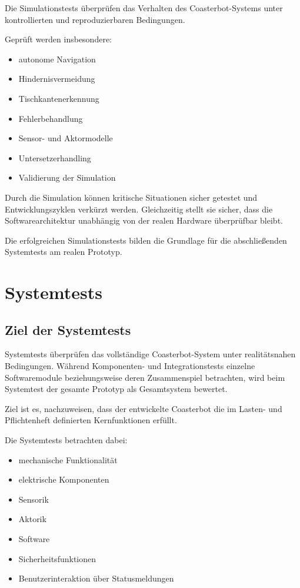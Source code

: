 \documentclass[
  a4paper,
  12pt,
  DIV=12,        %
  parskip=half,  %
  headings=small %
]{scrartcl}
\theoremstyle{definition}
\providecommand{\tightlist}{%
  \setlength{\itemsep}{0pt}\setlength{\parskip}{0pt}}
\theoremstyle{definition}
\begin{document}
Die Simulationstests überprüfen das Verhalten des Coasterbot-Systems
unter kontrollierten und reproduzierbaren Bedingungen.

Geprüft werden insbesondere:

\begin{itemize}
\tightlist
\item
  autonome Navigation
\item
  Hindernisvermeidung
\item
  Tischkantenerkennung
\item
  Fehlerbehandlung
\item
  Sensor- und Aktormodelle
\item
  Untersetzerhandling
\item
  Validierung der Simulation
\end{itemize}

Durch die Simulation können kritische Situationen sicher getestet und
Entwicklungszyklen verkürzt werden. Gleichzeitig stellt sie sicher, dass
die Softwarearchitektur unabhängig von der realen Hardware überprüfbar
bleibt.

Die erfolgreichen Simulationstests bilden die Grundlage für die
abschließenden Systemtests am realen Prototyp.

\section{Systemtests}\label{systemtests-1}

\subsection{Ziel der Systemtests}\label{ziel-der-systemtests}

Systemtests überprüfen das vollständige Coasterbot-System unter
realitätsnahen Bedingungen. Während Komponenten- und Integrationstests
einzelne Softwaremodule beziehungsweise deren Zusammenspiel betrachten,
wird beim Systemtest der gesamte Prototyp als Gesamtsystem bewertet.

Ziel ist es, nachzuweisen, dass der entwickelte Coasterbot die im
Lasten- und Pflichtenheft definierten Kernfunktionen erfüllt.

Die Systemtests betrachten dabei:

\begin{itemize}
\tightlist
\item
  mechanische Funktionalität
\item
  elektrische Komponenten
\item
  Sensorik
\item
  Aktorik
\item
  Software
\item
  Sicherheitsfunktionen
\item
  Benutzerinteraktion über Statusmeldungen
\end{itemize}
\end{document}
